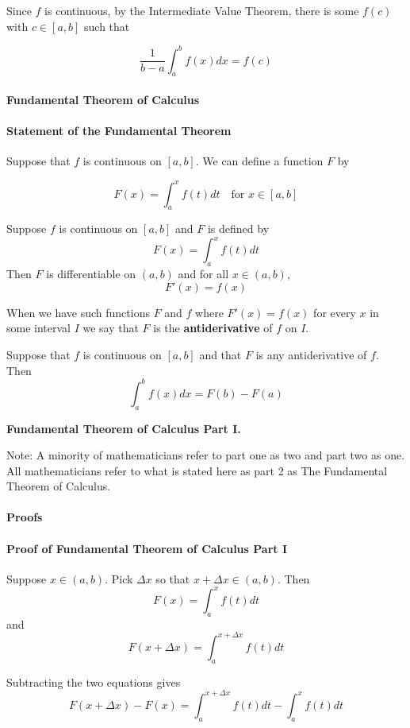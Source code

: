 Since $f$ is continuous, by the Intermediate Value Theorem, there is some $f(c)$ with $c \in [a,b]$ such that

$$\frac{1}{b-a} \int_a^b f(x)dx = f(c)$$

\paragraph{Fundamental Theorem of Calculus}

\paragraph{Statement of the Fundamental Theorem}

Suppose that $f$ is continuous on $[a,b]$. We can define a function $F$ by

$$F(x) = \int_a^x f(t)dt \quad \text{for } x \in [a,b]$$

Suppose $f$ is continuous on $[a,b]$ and $F$ is defined by
$$F(x) = \int_a^x f(t)dt$$
Then $F$ is differentiable on $(a,b)$ and for all $x \in (a,b)$,
$$F'(x) = f(x)$$

When we have such functions $F$ and $f$ where $F'(x) = f(x)$ for every $x$ in some interval $I$ we say that $F$ is the \textbf{antiderivative} of $f$ on $I$.

Suppose that $f$ is continuous on $[a,b]$ and that $F$ is any antiderivative of $f$.
Then
$$\int_a^b f(x)dx = F(b) - F(a)$$

\textbf{Fundamental Theorem of Calculus Part I.}

Note: A minority of mathematicians refer to part one as two and part two as one. All mathematicians refer to what is stated here as part 2 as The Fundamental Theorem of Calculus.

\paragraph{Proofs}

\paragraph{Proof of Fundamental Theorem of Calculus Part I}

Suppose $x \in (a,b)$. Pick $\Delta x$ so that $x + \Delta x \in (a,b)$. Then
$$F(x) = \int_a^x f(t)dt$$
and
$$F(x + \Delta x) = \int_a^{x + \Delta x} f(t)dt$$

Subtracting the two equations gives
$$F(x + \Delta x) - F(x) = \int_a^{x + \Delta x} f(t)dt - \int_a^x f(t)dt$$

